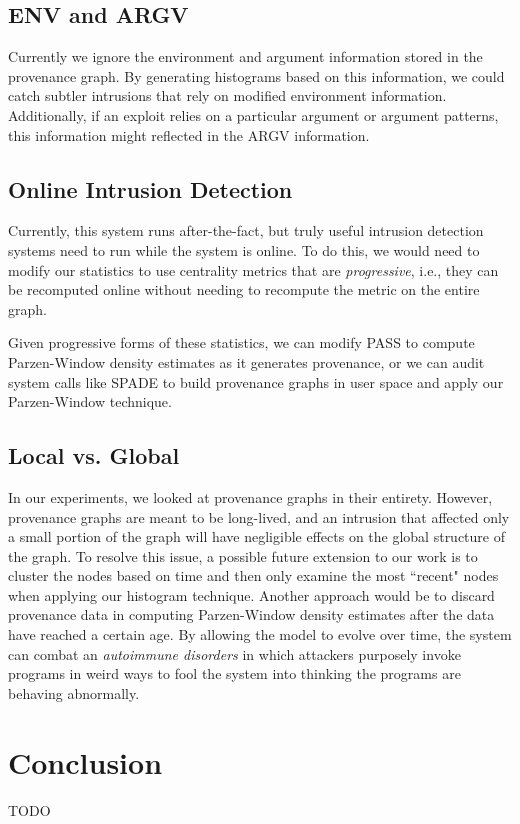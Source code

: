 \documentclass[10pt,twocolumn]{article}
\begin{document}
\subsection{ENV and ARGV}
Currently we ignore the environment and argument information stored in the provenance graph. By generating histograms based on this information, we could catch subtler intrusions that rely on modified environment information. Additionally, if an exploit relies on a particular argument or argument patterns, this information might reflected in the ARGV information.
\subsection{Online Intrusion Detection}
Currently, this system runs after-the-fact, but truly useful intrusion detection systems need to run while the system is online. To do this, we would need to modify our statistics to use centrality metrics that are {\em progressive}, i.e., they can be recomputed online without needing to recompute the metric on the entire graph. 

Given progressive forms of these statistics, we can modify PASS to compute Parzen-Window density estimates as it generates provenance, or we can audit system calls like SPADE \cite{spade} to build provenance graphs in user space and apply our Parzen-Window technique.
\subsection{Local vs. Global}
In our experiments, we looked at provenance graphs in their entirety. However, provenance graphs are meant to be long-lived, and an intrusion that affected only a small portion of the graph will have negligible effects on the global structure of the graph. To resolve this issue, a possible future extension to our work is to cluster the nodes based on time \cite{clustering} and then only examine the most ``recent" nodes when applying our histogram technique. Another approach would be to discard provenance data in computing Parzen-Window density estimates after the data have reached a certain age. By allowing the model to evolve over time, the system
can combat an {\em autoimmune disorders} in which attackers purposely invoke programs in weird ways to fool the system into thinking the programs are
behaving abnormally.

\section{Conclusion}
TODO
\end{document}
